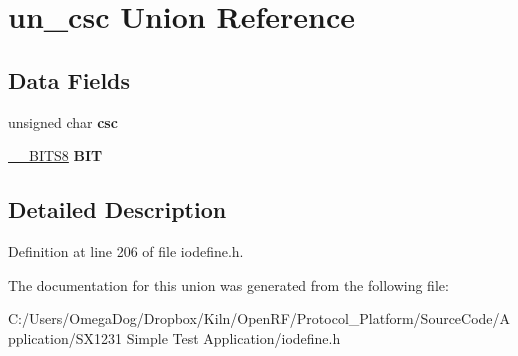 \hypertarget{unionun__csc}{\section{un\-\_\-csc Union Reference}
\label{unionun__csc}
}
\subsection*{Data Fields}
\begin{DoxyCompactItemize}
\item 
\hypertarget{unionun__csc_ab3896a69c298ed5255e3434dfe70c7b9}{unsigned char {\bfseries csc}}\label{unionun__csc_ab3896a69c298ed5255e3434dfe70c7b9}

\item 
\hypertarget{unionun__csc_a82164ec838701512438b8632b41f57d2}{\hyperlink{struct_____b_i_t_s8}{\-\_\-\-\_\-\-B\-I\-T\-S8} {\bfseries B\-I\-T}}\label{unionun__csc_a82164ec838701512438b8632b41f57d2}

\end{DoxyCompactItemize}


\subsection{Detailed Description}


Definition at line 206 of file iodefine.\-h.



The documentation for this union was generated from the following file\-:\begin{DoxyCompactItemize}
\item 
C\-:/\-Users/\-Omega\-Dog/\-Dropbox/\-Kiln/\-Open\-R\-F/\-Protocol\-\_\-\-Platform/\-Source\-Code/\-Application/\-S\-X1231 Simple Test Application/iodefine.\-h\end{DoxyCompactItemize}
